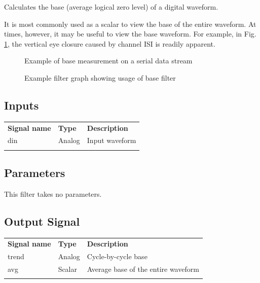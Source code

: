 Calculates the base (average logical zero level) of a digital waveform.

It is most commonly used as a scalar to view the base of the entire waveform. At times, however, it may be useful to
view the base waveform. For example, in Fig. \ref{filter_base}, the vertical eye closure caused by channel ISI is
readily apparent.

\begin{figure}[h]
\centering
{}
\caption{Example of base measurement on a serial data stream}
\label{filter_base}
\end{figure}

\begin{figure}[h]
\centering
{}
\caption{Example filter graph showing usage of base filter}
\label{filter_graph_base}
\end{figure}
\FloatBarrier

\subsection{Inputs}

\begin{tabularx}{16cm}{llX}
\thickhline
\textbf{Signal name} & \textbf{Type} & \textbf{Description} \\
\thickhline
din & Analog & Input waveform \\
\thickhline
\end{tabularx}

\subsection{Parameters}

This filter takes no parameters.

\subsection{Output Signal}

\begin{tabularx}{16cm}{llX}
\thickhline
\textbf{Signal name} & \textbf{Type} & \textbf{Description} \\
\thickhline
trend & Analog & Cycle-by-cycle base \\
\thinhline
avg & Scalar & Average base of the entire waveform \\
\thickhline
\end{tabularx}

